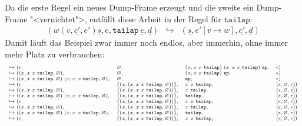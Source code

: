 %
Da die erste Regel ein neues Dump-Frame erzeugt und die zweite ein
Dump-Frame "<vernichtet">, entfällt diese Arbeit in der Regel für
$\mathtt{tailap}$:
%
\begin{eqnarray*}
  (w (v,\underline{c'}, e') \underline{s}, e, \mathtt{tailap}~\underline{c}, \underline{d})
  &\hookrightarrow&
  (\underline{s}, e'[v \mapsto w], \underline{c'}, \underline{d})
\end{eqnarray*}
%
Damit läuft das Beispiel zwar immer noch endlos, aber immerhin, ohne
immer mehr Platz zu verbrauchen:
%
\begin{displaymath}\scriptsize
  \begin{array}{l@{}llll}
 \hookrightarrow{}&(\epsilon, &\varnothing, &(x, x~x~\mathtt{tailap})~(x, x~x~\mathtt{tailap})~\mathtt{ap}, &\epsilon)\\
\hookrightarrow{}&((x, x~x~\mathtt{tailap}, \varnothing), &\varnothing, &(x, x~x~\mathtt{tailap})~\mathtt{ap}, &\epsilon)\\
\hookrightarrow{}&((x, x~x~\mathtt{tailap}, \varnothing)~(x, x~x~\mathtt{tailap}, \varnothing), &\varnothing, &\mathtt{ap}, &\epsilon)\\
\hookrightarrow{}&(\epsilon, &\{(x, (x, x~x~\mathtt{tailap}, \varnothing))\}, &x~x~\mathtt{tailap}, &(\epsilon, \varnothing, \epsilon))\\
\hookrightarrow{}&((x, x~x~\mathtt{tailap}, \varnothing), &\{(x, (x, x~x~\mathtt{tailap}, \varnothing))\}, &x~\mathtt{tailap}, &(\epsilon, \varnothing, \epsilon))\\
\hookrightarrow{}&((x, x~x~\mathtt{tailap}, \varnothing)~(x, x~x~\mathtt{tailap}, \varnothing), &\{(x, (x, x~x~\mathtt{tailap}, \varnothing))\}, &\mathtt{tailap}, &(\epsilon, \varnothing, \epsilon))\\
\hookrightarrow{}&(\epsilon, &\{(x, (x, x~x~\mathtt{tailap}, \varnothing))\}, &x~x~\mathtt{tailap}, &(\epsilon, \varnothing, \epsilon))\\
\hookrightarrow{}&((x, x~x~\mathtt{tailap}, \varnothing), &\{(x, (x, x~x~\mathtt{tailap}, \varnothing))\}, &x~\mathtt{tailap}, &(\epsilon, \varnothing, \epsilon))\\
\hookrightarrow{}&((x, x~x~\mathtt{tailap}, \varnothing)~(x, x~x~\mathtt{tailap}, \varnothing), &\{(x, (x, x~x~\mathtt{tailap}, \varnothing))\}, &\mathtt{tailap}, &(\epsilon, \varnothing, \epsilon))\\
\hookrightarrow{}&(\epsilon, &\{(x, (x, x~x~\mathtt{tailap}, \varnothing))\}, &x~x~\mathtt{tailap}, &(\epsilon, \varnothing, \epsilon))\\

\end{array}
\end{displaymath}
